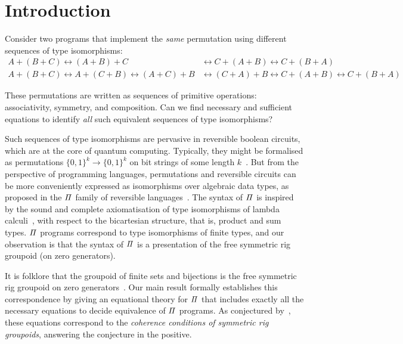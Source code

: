 \section{Introduction}
\label{sec:introduction}

Consider two programs that implement the \emph{same} permutation using different sequences of type isomorphisms:
\begin{align*}
      A + (B + C) \leftrightarrow
      (A + B) + C & \leftrightarrow
      C + (A + B) \leftrightarrow
      C + (B + A)
      \\
      A + (B + C) \leftrightarrow
      A + (C + B) \leftrightarrow
      (A + C) + B & \leftrightarrow
      (C + A) + B \leftrightarrow
      C + (A + B) \leftrightarrow
      C + (B + A)
\end{align*}

\noindent These permutations are written as sequences of primitive operations: associativity, symmetry, and
composition. Can we find necessary and sufficient equations to identify \emph{all} such equivalent sequences of type
isomorphisms?

Such sequences of type isomorphisms are pervasive in reversible boolean circuits, which are at the core of quantum
computing. Typically, they might be formalised as permutations $\{0,1\}^k \to \{0,1\}^k$ on bit strings of some length
$k$~\cite{aaronsonClassificationReversibleBit2017}. But from the perspective of programming languages, permutations and
reversible circuits can be more conveniently expressed as isomorphisms over algebraic data types, as proposed in the
$\mathit{\Pi}$ family of reversible languages~\cite*{jamesInformationEffects2012, jamesTheseusHighLevelLanguage2014}. The
syntax of $\mathit{\Pi}$ is inspired by the sound and complete axiomatisation of type isomorphisms of lambda
calculi~\cite{fioreRemarksIsomorphismsTyped2002}, with respect to the bicartesian structure, that is, product and sum
types. $\mathit{\Pi}$ programs correspond to type isomorphisms of finite types, and our observation is that the syntax of
$\mathit{\Pi}$ is a presentation of the free symmetric rig groupoid (on zero generators).

It is folklore that the groupoid of finite sets and bijections is the free symmetric rig groupoid on zero
generators~\cite{laplazaCoherenceDistributivity1972, kellyCoherenceTheoremsLax1974, baezFiniteSetsFeynman2001}. Our main
result formally establishes this correspondence by giving an equational theory for $\mathit{\Pi}$ that includes exactly all
the necessary equations to decide equivalence of $\mathit{\Pi}$ programs. As conjectured
by~\citet{caretteComputingSemiringsWeak2016}, these equations correspond to the \emph{coherence conditions of symmetric
      rig groupoids}, answering the conjecture in the positive.

